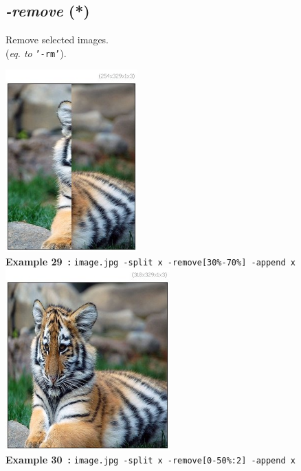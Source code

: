 \documentclass[a4paper,11pt,twoside]{book}
\begin{document}
\subsection{\emph{-remove} (*)}\vspace*{-0.5em}
Remove selected images.
~\\(\emph{eq. to} {\small \texttt{'-rm'}}).
\begin{center}\includegraphics[keepaspectratio=true,height=7cm,width=\textwidth]{img/gmic_def29.jpg}\\
{\footnotesize \textbf{Example 29~:} \texttt{image.jpg -split x -remove[30\%-70\%] -append x}}
\\\includegraphics[keepaspectratio=true,height=7cm,width=\textwidth]{img/gmic_def30.jpg}\\
{\footnotesize \textbf{Example 30~:} \texttt{image.jpg -split x -remove[0-50\%:2] -append x}}
\end{center}
\end{document}
